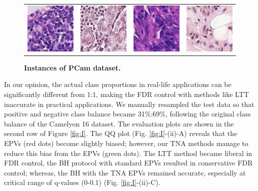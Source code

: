 \documentclass{article}
\begin{document}
\begin{figure}[h!]
	\centering
	\begin{tabular}{cccc}
		\includegraphics[width=1.in]{img/pcam1.jpg} &
		\includegraphics[width=1.in]{img/pcam2.jpg} & 
		\includegraphics[width=1.in]{img/pcam3.jpg} &
		\includegraphics[width=1.in]{img/pcam4.jpg}
	\end{tabular}
	\caption{{\bf Instances of PCam dataset.}}
	\label{fig:pcam_example}
\end{figure} 
 
In our opinion, the actual class proportions in real-life applications can be significantly different from 1:1, making the FDR control with methods like LTT inaccurate in practical applications. We manually resampled the test data so that  positive and negative class balance became 31\%:69\%, following the original class balance of the Camelyon 16 dataset. The evaluation plots are shown in the second row of Figure \ref{fig:I}. The QQ plot (Fig. \ref{fig:I}-(ii)-A) reveals that the EPVs (red dots) become slightly biased; however, our TNA methods manage to reduce this bias from the EPVs (green dots). The LTT method became liberal in FDR control, the BH protocol with standard EPVs resulted in conservative FDR control; whereas, the BH with the TNA EPVs remained accurate, especially at critical range of q-values (0-0.1) (Fig. \ref{fig:I}-(ii)-C).
\end{document}
